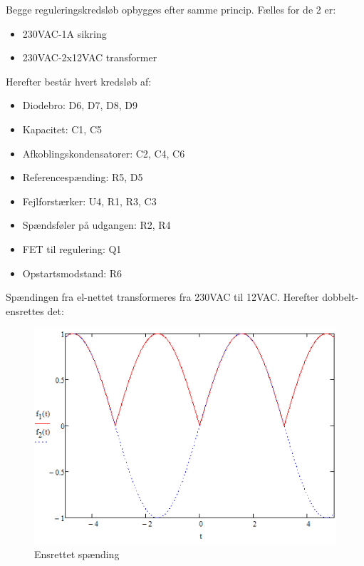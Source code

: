 Begge reguleringskredsløb opbygges efter samme princip. Fælles for de 2 er:
\begin{itemize}
\item 230VAC-1A sikring
\item 230VAC-2x12VAC transformer
\end{itemize}

Herefter består hvert kredsløb af:
\begin{itemize}
\item Diodebro: D6, D7, D8, D9
\item Kapacitet: C1, C5
\item Afkoblingskondensatorer: C2, C4, C6
\item Referencespænding: R5, D5
\item Fejlforstærker: U4, R1, R3, C3
\item Spændsføler på udgangen: R2, R4
\item FET til regulering: Q1
\item Opstartsmodstand: R6
\end{itemize}

Spændingen fra el-nettet transformeres fra 230VAC til 12VAC. Herefter dobbelt-ensrettes det:

\begin{figure}[H]
	\centering
	\includegraphics[scale=1]{../Hardware/PSU/Ensretning}
	\caption{Ensrettet spænding}
	\label{photo:Ensrettet}
\end{figure}

